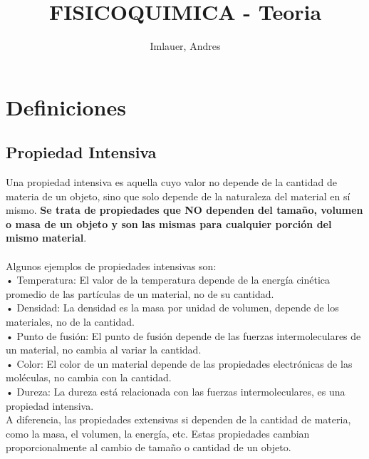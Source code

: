 \documentclass{article}
\title{FISICOQUIMICA - Teoria}
\author{Imlauer, Andres}
\date{} %
\begin{document}
\maketitle
\section{Definiciones}
\subsection{Propiedad Intensiva}
Una propiedad intensiva es aquella cuyo valor no depende de la cantidad de materia de un objeto, sino que solo depende de la naturaleza del material en sí mismo. \textbf{Se trata de propiedades que NO dependen del tamaño, volumen o masa de un objeto y son las mismas para cualquier porción del mismo material}.\\
\\
Algunos ejemplos de propiedades intensivas son:\\
• Temperatura: El valor de la temperatura depende de la energía cinética promedio de las partículas de un material, no de su cantidad.\\
• Densidad: La densidad es la masa por unidad de volumen, depende de los materiales, no de la cantidad.\\
• Punto de fusión: El punto de fusión depende de las fuerzas intermoleculares de un material, no cambia al variar la cantidad.\\
• Color: El color de un material depende de las propiedades electrónicas de las moléculas, no cambia con la cantidad.\\
• Dureza: La dureza está relacionada con las fuerzas intermoleculares, es una propiedad intensiva.\\
A diferencia, las propiedades extensivas si dependen de la cantidad de materia, como la masa, el volumen, la energía, etc. Estas propiedades cambian proporcionalmente al cambio de tamaño o cantidad de un objeto.\\
\end{document}
